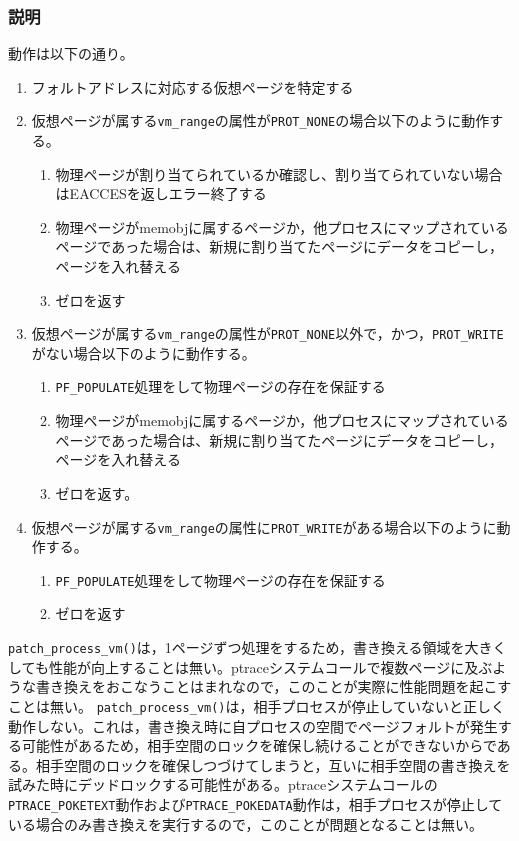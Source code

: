\documentclass[twoside,11pt,fleqn]{book}
\begin{document}
{\subsubsection*{説明}{\quad}
動作は以下の通り。
\begin{enumerate}
\item フォルトアドレスに対応する仮想ページを特定する
\item 仮想ページが属する\texttt{vm\_range}の属性が\texttt{PROT\_NONE}の場合以下のように動作する。
\begin{enumerate}
\item 物理ページが割り当てられているか確認し、割り当てられていない場合はEACCESを返しエラー終了する
\item 物理ページがmemobjに属するページか，他プロセスにマップされているページであった場合は、新規に割り当てたページにデータをコピーし，ページを入れ替える
\item ゼロを返す
\end{enumerate}
\item 仮想ページが属する\texttt{vm\_range}の属性が\texttt{PROT\_NONE}以外で，かつ，\texttt{PROT\_WRITE}がない場合以下のように動作する。
\begin{enumerate}
\item \texttt{PF\_POPULATE}処理をして物理ページの存在を保証する
\item 物理ページがmemobjに属するページか，他プロセスにマップされているページであった場合は、新規に割り当てたページにデータをコピーし，ページを入れ替える
\item ゼロを返す。
\end{enumerate}
\item 仮想ページが属する\texttt{vm\_range}の属性に\texttt{PROT\_WRITE}がある場合以下のように動作する。
\begin{enumerate}
\item \texttt{PF\_POPULATE}処理をして物理ページの存在を保証する
\item ゼロを返す
\end{enumerate}
\end{enumerate}

\texttt{patch\_process\_vm()}は，1ページずつ処理をするため，書き換える領域を大きくしても性能が向上することは無い。ptraceシステムコールで複数ページに及ぶような書き換えをおこなうことはまれなので，このことが実際に性能問題を起こすことは無い。
\texttt{patch\_process\_vm()}は，相手プロセスが停止していないと正しく動作しない。これは，書き換え時に自プロセスの空間でページフォルトが発生する可能性があるため，相手空間のロックを確保し続けることができないからである。相手空間のロックを確保しつづけてしまうと，互いに相手空間の書き換えを試みた時にデッドロックする可能性がある。ptraceシステムコールの\texttt{PTRACE\_POKETEXT}動作および\texttt{PTRACE\_POKEDATA}動作は，相手プロセスが停止している場合のみ書き換えを実行するので，このことが問題となることは無い。

}
\end{document}
